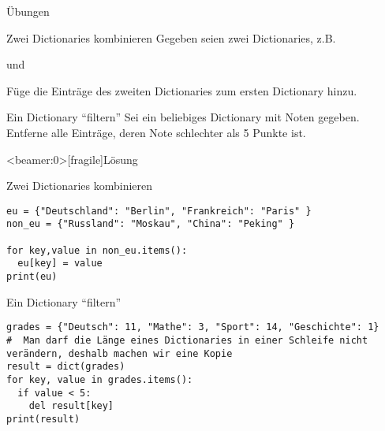 \begin{frame}{Übungen}

\begin{block}{Zwei Dictionaries kombinieren}
	\vspace{2pt}
Gegeben seien zwei Dictionaries, z.B.  


und 


Füge die Einträge des zweiten Dictionaries zum ersten Dictionary hinzu. 
\end{block}

\pause 

\vspace{12pt}

\begin{block}{Ein Dictionary \enquote{filtern}}
\vspace{2pt}
Sei ein beliebiges Dictionary mit Noten gegeben. Entferne alle Einträge, deren Note schlechter als 5 Punkte ist. 
\end{block}
\end{frame}


\begin{frame}<beamer:0>[fragile]{Lösung}

\begin{solutionblock}{Zwei Dictionaries kombinieren}
\begin{verbatim}
eu = {"Deutschland": "Berlin", "Frankreich": "Paris" }
non_eu = {"Russland": "Moskau", "China": "Peking" }

for key,value in non_eu.items():
  eu[key] = value
print(eu)
\end{verbatim}
\end{solutionblock}

\vspace{12pt}

\begin{solutionblock}{Ein Dictionary \enquote{filtern}}
\begin{verbatim}
grades = {"Deutsch": 11, "Mathe": 3, "Sport": 14, "Geschichte": 1}
#  Man darf die Länge eines Dictionaries in einer Schleife nicht verändern, deshalb machen wir eine Kopie
result = dict(grades)
for key, value in grades.items():
  if value < 5:
    del result[key]
print(result)
\end{verbatim}
\end{solutionblock}

\end{frame}



